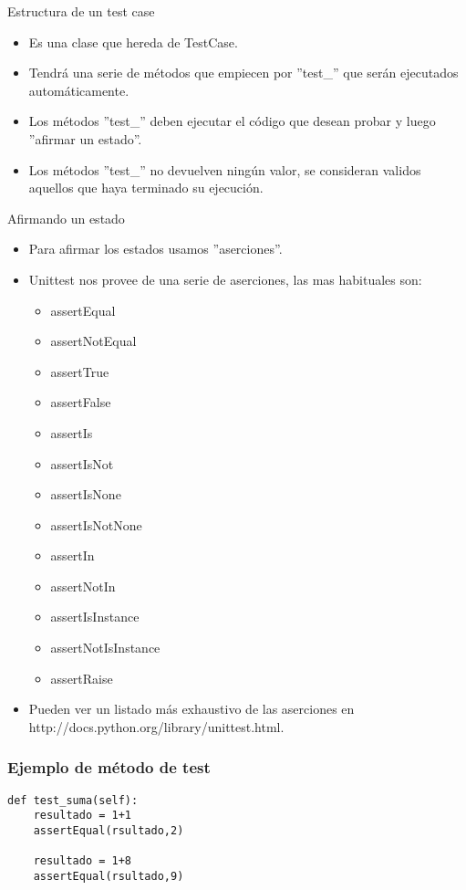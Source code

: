 \documentclass[10pt]{beamer}
\begin{document}
  \begin{frame}{Estructura de un test case}
    \begin{itemize}
      \item Es una clase que hereda de TestCase.
      \item Tendrá una serie de métodos que empiecen por ''test\_'' que serán ejecutados automáticamente.
      \item Los métodos ''test\_'' deben ejecutar el código que desean probar y luego ''afirmar un estado''.
      \item Los métodos ''test\_'' no devuelven ningún valor, se consideran validos aquellos que haya terminado su ejecución.
    \end{itemize}
  \end{frame}

  \begin{frame}{Afirmando un estado}
    \begin{itemize}
      \item Para afirmar los estados usamos ''aserciones''.
      \item Unittest nos provee de una serie de aserciones, las mas habituales son:
      \begin{itemize}
        \item assertEqual
        \item assertNotEqual
        \item assertTrue
        \item assertFalse
        \item assertIs
        \item assertIsNot
        \item assertIsNone
        \item assertIsNotNone
        \item assertIn
        \item assertNotIn
        \item assertIsInstance
        \item assertNotIsInstance
        \item assertRaise
      \end{itemize}
      \item Pueden ver un listado más exhaustivo de las aserciones en http://docs.python.org/library/unittest.html.
    \end{itemize}
  \end{frame}

  \begin{frame}[containsverbatim]
    \frametitle{Ejemplo de método de test}
    \begin{verbatim}
def test_suma(self):
    resultado = 1+1
    assertEqual(rsultado,2)

    resultado = 1+8
    assertEqual(rsultado,9)
    \end{verbatim}
  \end{frame}
\end{document}
